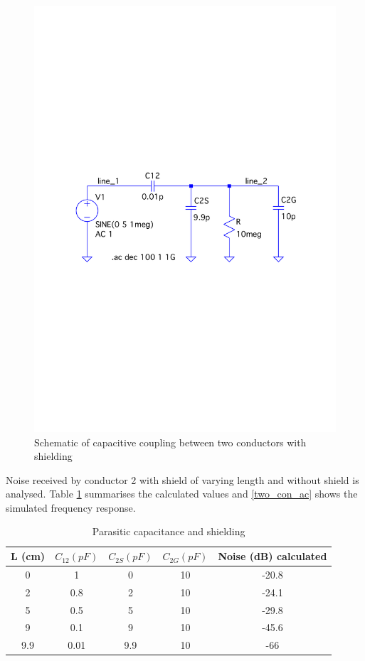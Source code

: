 \documentclass[12pt,a4paper,UKenglish]{article}
\begin{document}
\begin{figure} [H]
  \centering 
  \includegraphics[width=\textwidth]{img/sch_4b.pdf} 
  \caption{Schematic of capacitive coupling between two conductors with shielding}
  \label{sch_4b} 
\end{figure}

Noise received by conductor 2 with shield of varying length and without shield is analysed. Table \ref{noise} summarises the calculated values and   \ref{two_con_ac} shows the simulated frequency response.
\begin{table}[H]
\caption{Parasitic capacitance and shielding}
\begin{center}
\begin{tabular}{c|c|c|c|c}
\hline \hline
L  (cm) & $C_{12} (pF)$ & $C_{2S} (pF)$ & $C_{2G} (pF)$ & Noise (dB) calculated\\ \hline
0  & 1 & 0 & 10 & -20.8 \\ \hline
2  & 0.8 & 2 & 10 & -24.1\\ \hline
5  & 0.5 & 5  & 10 & -29.8 \\ \hline
9  & 0.1 & 9  & 10 &-45.6\\ \hline
9.9  & 0.01 & 9.9 & 10 &-66\\ 
\hline \hline
\end{tabular}
\end{center}
\label{noise}
\end{table}%
\end{document}
